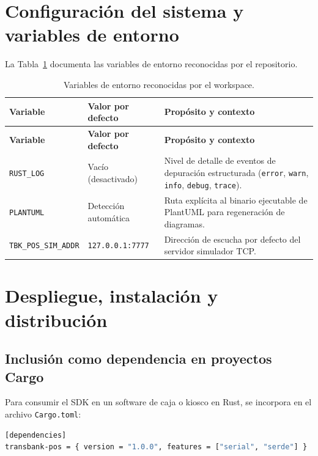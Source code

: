 \documentclass{../../plantilla/raysac-informe}
\begin{document}
\section{Configuración del sistema y variables de entorno}

La Tabla~\ref{tab:variables-entorno} documenta las variables de entorno reconocidas por el repositorio.

\begin{longtable}{@{}p{4.2cm}p{3.2cm}p{6.6cm}@{}}
\caption{Variables de entorno reconocidas por el workspace.}\label{tab:variables-entorno}\\
\toprule
\textbf{Variable} & \textbf{Valor por defecto} & \textbf{Propósito y contexto} \\
\midrule
\endfirsthead
\toprule
\textbf{Variable} & \textbf{Valor por defecto} & \textbf{Propósito y contexto} \\
\midrule
\endhead
\bottomrule
\endlastfoot
\texttt{RUST\_LOG} & Vacío (desactivado) & Nivel de detalle de eventos de depuración estructurada (\texttt{error}, \texttt{warn}, \texttt{info}, \texttt{debug}, \texttt{trace}). \\
\texttt{PLANTUML} & Detección automática & Ruta explícita al binario ejecutable de PlantUML para regeneración de diagramas. \\
\texttt{TBK\_POS\_SIM\_ADDR} & \texttt{127.0.0.1:7777} & Dirección de escucha por defecto del servidor simulador TCP. \\
\end{longtable}

\clearpage
\section{Despliegue, instalación y distribución}

\subsection{Inclusión como dependencia en proyectos Cargo}
Para consumir el SDK en un software de caja o kiosco en Rust, se incorpora en el archivo \texttt{Cargo.toml}:

\begin{lstlisting}[language=bash,caption={Configuración de dependencias en proyectos consumidores.}]
[dependencies]
transbank-pos = { version = "1.0.0", features = ["serial", "serde"] }
\end{lstlisting}
\end{document}
